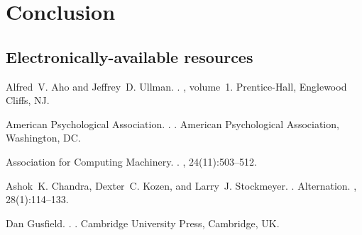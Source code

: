 \documentclass[11pt]{article}
\begin{document}
\section{Conclusion}



\subsection{Electronically-available resources}

%
%

\begin{thebibliography}{}

Alfred~V. Aho and Jeffrey~D. Ullman.
.
, volume~1.
\newblock Prentice-{Hall}, Englewood Cliffs, NJ.

{American Psychological Association}.
.
.
\newblock American Psychological Association, Washington, DC.

{Association for Computing Machinery}.
.
, 24(11):503--512.

Ashok~K. Chandra, Dexter~C. Kozen, and Larry~J. Stockmeyer.
.
\newblock Alternation.
,
  28(1):114--133.

Dan Gusfield.
.
.
\newblock Cambridge University Press, Cambridge, UK.

\end{thebibliography}
\end{document}
